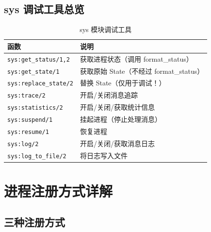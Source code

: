\documentclass[a4paper,11pt]{article}
\begin{document}
\subsection{sys 调试工具总览}

\begin{table}[H]
\centering
\small
\begin{tabular}{@{}lp{7cm}@{}}
\toprule
\textbf{函数} & \textbf{说明} \\
\midrule
\texttt{sys:get\_status/1,2} & 获取进程状态（调用 format\_status） \\
\texttt{sys:get\_state/1} & 获取原始 State（不经过 format\_status） \\
\texttt{sys:replace\_state/2} & 替换 State（仅用于调试！） \\
\texttt{sys:trace/2} & 开启/关闭消息追踪 \\
\texttt{sys:statistics/2} & 开启/关闭/获取统计信息 \\
\texttt{sys:suspend/1} & 挂起进程（停止处理消息） \\
\texttt{sys:resume/1} & 恢复进程 \\
\texttt{sys:log/2} & 开启/关闭/获取消息日志 \\
\texttt{sys:log\_to\_file/2} & 将日志写入文件 \\
\bottomrule
\end{tabular}
\caption{sys 模块调试工具}
\end{table}


\section{进程注册方式详解}

\subsection{三种注册方式}
\end{document}
